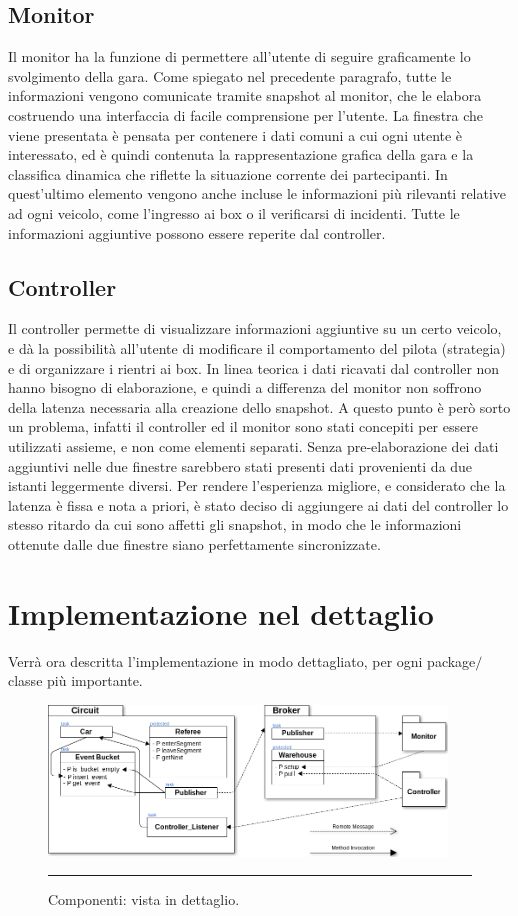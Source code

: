 \subsection{Monitor}

Il monitor ha la funzione di permettere all’utente di seguire graficamente lo svolgimento della gara. Come spiegato nel precedente paragrafo, tutte le informazioni vengono comunicate tramite snapshot al monitor, che le elabora costruendo una interfaccia di facile comprensione per l’utente.
La finestra che viene presentata è pensata per contenere i dati comuni a cui ogni utente è interessato, ed è quindi contenuta la rappresentazione grafica della gara e la classifica dinamica che riflette la situazione corrente dei partecipanti. In quest’ultimo elemento vengono anche incluse le informazioni più rilevanti relative ad ogni veicolo, come l’ingresso ai box o il verificarsi di incidenti.
Tutte le informazioni aggiuntive possono essere reperite dal controller.

\subsection{Controller}

Il controller permette di visualizzare informazioni aggiuntive su un certo veicolo, e dà la possibilità all’utente di modificare il comportamento del pilota (strategia) e di organizzare i rientri ai box. 
In linea teorica i dati ricavati dal controller non hanno bisogno di elaborazione, e quindi a differenza del monitor non soffrono della latenza necessaria alla creazione dello snapshot.
A questo punto è però sorto un problema, infatti il controller ed il monitor sono stati concepiti per essere utilizzati assieme, e non come elementi separati.  Senza pre-elaborazione dei dati aggiuntivi  nelle due finestre sarebbero stati presenti dati provenienti da due istanti leggermente diversi. Per rendere l’esperienza migliore, e considerato che la latenza è fissa e nota a priori, è stato deciso di aggiungere ai dati del controller lo stesso ritardo da cui sono affetti gli snapshot, in modo che le informazioni ottenute dalle due finestre siano perfettamente sincronizzate.

\section{Implementazione nel dettaglio}

Verrà ora descritta l’implementazione in modo dettagliato, per ogni package$/$classe più importante.
\begin{figure}[htbp]
	\centering
		\includegraphics[keepaspectratio = true, width = 400px] {Pictures/SchemaOverview}
		\rule{35em}{0.5pt}
	\caption[Componenti]{Componenti: vista in dettaglio.}
	\label{fig:SchemaOverview}
\end{figure}

